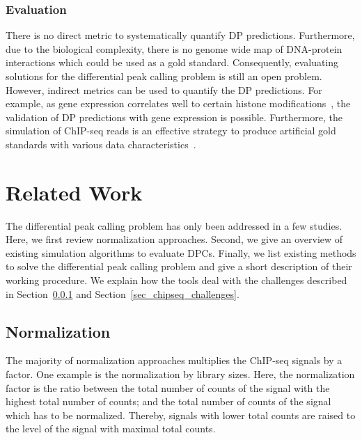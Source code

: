\subsubsection{Evaluation}
\label{sec_challenges_eval}
There is no direct metric to systematically quantify DP predictions.
Furthermore, due to the biological complexity, there is no genome wide map of DNA-protein interactions which could be used as a gold standard.
Consequently, evaluating solutions for the differential peak calling problem is still an open problem.
However, indirect metrics can be used to quantify the DP predictions.
For example, as gene expression correlates well to certain histone modifications~\citep{Karlic2010}, the validation of DP predictions with gene expression is possible.
Furthermore, the simulation of ChIP-seq reads is an effective strategy to produce artificial gold standards with various data characteristics~\citep{humburg2011, zhang2008, Aaron2014}.


\section{Related Work}
The differential peak calling problem has only been addressed in a few studies. 
Here, we first review normalization approaches.
Second, we give an overview of existing simulation algorithms to evaluate DPCs.
Finally, we list existing methods to solve the differential peak calling problem and give a short description of their working procedure.
We explain how the tools deal with the challenges described in Section~\ref{sec_challenges_eval} and Section~\ref{sec_chipseq_challenges}.

\subsection{Normalization}
\label{sec_back_norm}
The majority of normalization approaches multiplies the ChIP-seq signals by a factor.
One example is the normalization by library sizes. 
Here, the normalization factor is the ratio between the total number of counts of the signal with the highest total number of counts; and the total number of counts of the signal which has to be normalized.
Thereby, signals with lower total counts are raised to the level of the signal with maximal total counts.

